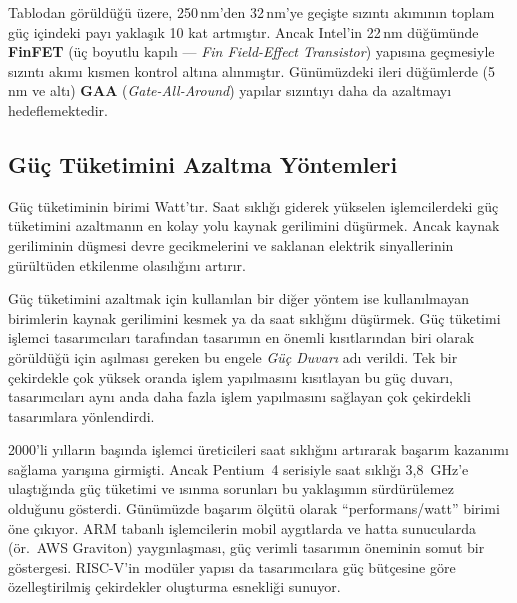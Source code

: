 Tablodan görüldüğü üzere, 250\,nm'den 32\,nm'ye geçişte sızıntı akımının toplam güç içindeki payı yaklaşık 10 kat artmıştır. Ancak Intel'in 22\,nm düğümünde \textbf{FinFET} (üç boyutlu kapılı --- \emph{Fin Field-Effect Transistor}) yapısına geçmesiyle sızıntı akımı kısmen kontrol altına alınmıştır. Günümüzdeki ileri düğümlerde (5\,nm ve altı) \textbf{GAA} (\emph{Gate-All-Around}) yapılar sızıntıyı daha da azaltmayı hedeflemektedir.


\subsection{Güç Tüketimini Azaltma Yöntemleri}
\label{sec:guc-azaltma}

Güç tüketiminin birimi Watt'tır. Saat sıklığı giderek yükselen işlemcilerdeki güç tüketimini azaltmanın en kolay yolu kaynak gerilimini düşürmek. Ancak kaynak geriliminin düşmesi devre gecikmelerini ve saklanan elektrik sinyallerinin gürültüden etkilenme olasılığını artırır.

Güç tüketimini azaltmak için kullanılan bir diğer yöntem ise kullanılmayan birimlerin kaynak gerilimini kesmek ya da saat sıklığını düşürmek. Güç tüketimi işlemci tasarımcıları tarafından tasarımın en önemli kısıtlarından biri olarak görüldüğü için aşılması gereken bu engele \emph{Güç Duvarı} adı verildi. Tek bir çekirdekle çok yüksek oranda işlem yapılmasını kısıtlayan bu güç duvarı, tasarımcıları aynı anda daha fazla işlem yapılmasını sağlayan çok çekirdekli tasarımlara yönlendirdi.

\begin{bilginot}
2000'li yılların başında işlemci üreticileri saat sıklığını artırarak başarım kazanımı sağlama yarışına girmişti. Ancak Pentium~4 serisiyle saat sıklığı 3{,}8~GHz'e ulaştığında güç tüketimi ve ısınma sorunları bu yaklaşımın sürdürülemez olduğunu gösterdi. Günümüzde başarım ölçütü olarak ``performans/watt'' birimi öne çıkıyor. ARM tabanlı işlemcilerin mobil aygıtlarda ve hatta sunucularda (ör.\ AWS Graviton) yaygınlaşması, güç verimli tasarımın öneminin somut bir göstergesi. RISC-V'in modüler yapısı da tasarımcılara güç bütçesine göre özelleştirilmiş çekirdekler oluşturma esnekliği sunuyor.
\end{bilginot}


